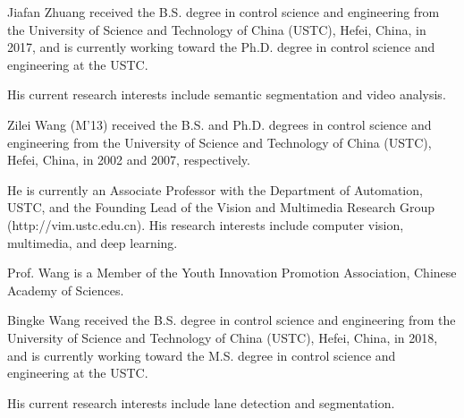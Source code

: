 \documentclass[journal]{IEEEtran}
\begin{document}
\newpage

\begin{IEEEbiography}
	{Jiafan Zhuang}	received the B.S. degree in control science and engineering from the University of Science and Technology of China (USTC), Hefei, China, in 2017, and is currently working toward the Ph.D. degree in control science and engineering at the USTC.
	
	His current research interests include semantic segmentation and video analysis.
\end{IEEEbiography}

\vspace{-120mm}

\begin{IEEEbiography}
	{Zilei Wang (M'13)}	received the B.S. and Ph.D.	degrees in control science and engineering from	the University of Science and Technology of China (USTC), Hefei, China, in 2002 and 2007, respectively.
	
	He is currently an Associate Professor with the	Department of Automation, USTC, and the Founding Lead of the Vision and Multimedia Research	Group (http://vim.ustc.edu.cn). His research interests include computer vision, multimedia, and deep learning.
	
	Prof. Wang is a Member of the Youth Innovation Promotion Association, Chinese Academy of Sciences.
\end{IEEEbiography}

\vspace{-120mm}

\begin{IEEEbiography}
	{Bingke Wang}	received the B.S. degree in control science and engineering from the University of Science and Technology of China (USTC), Hefei, China, in 2018, and is currently working toward the M.S. degree in control science and engineering at the USTC.
	
	His current research interests include lane detection and segmentation.
\end{IEEEbiography}
\end{document}

